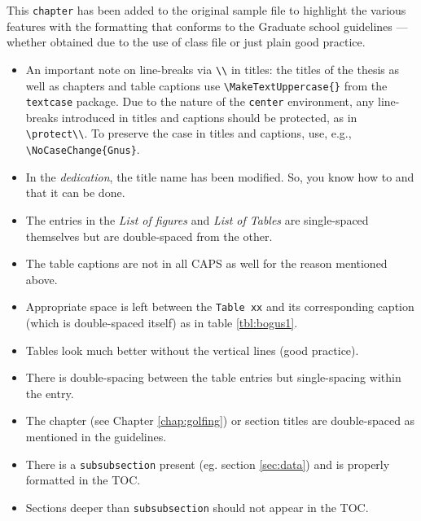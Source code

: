 \documentclass[final,numrefs,sort&compress,twoadvisors]{nddiss2e}
\begin{document}
%
%

This \verb+chapter+ has been added to the original sample file to highlight the
various features with the formatting that conforms to the Graduate school
guidelines --- whether obtained due to the use of \nddiss\/ class file or just
plain good practice.
\begin{itemize}
\item An important note on line-breaks via \verb+\\+ in titles: the
  titles of the thesis as well as chapters and table captions use
  \verb+\MakeTextUppercase{}+ from the \verb+textcase+ package.  Due
  to the nature of the \verb+center+ environment, any line-breaks
  introduced in titles and captions should be protected, as in
  \verb+\protect\\+.
  To preserve the case in titles and captions, use, e.g.,
  \verb+\NoCaseChange{Gnus}+.
\item In the \emph{dedication}, the title name has been modified. So, you know
how to and that it can be done.
\item The entries in the \emph{List of figures} and \emph{List of Tables} are
single-spaced themselves but are double-spaced from the other.
\item The table captions are not in all CAPS as well for the reason mentioned
above.
\item Appropriate space is left between the \verb+Table xx+ and its
corresponding caption (which is double-spaced itself) as in table \ref{tbl:bogus1}.
\item Tables look much better without the vertical lines (good practice).
\item There is double-spacing between the table entries but single-spacing
within the entry.
\item The chapter (see Chapter \ref{chap:golfing}) or section titles are
double-spaced as mentioned in the guidelines.
\item There is a \verb+subsubsection+ present (eg. section \ref{sec:data}) and
is properly formatted in the TOC.
\item Sections deeper than \verb+subsubsection+ should not appear in the TOC.

\end{itemize}
\end{document}
